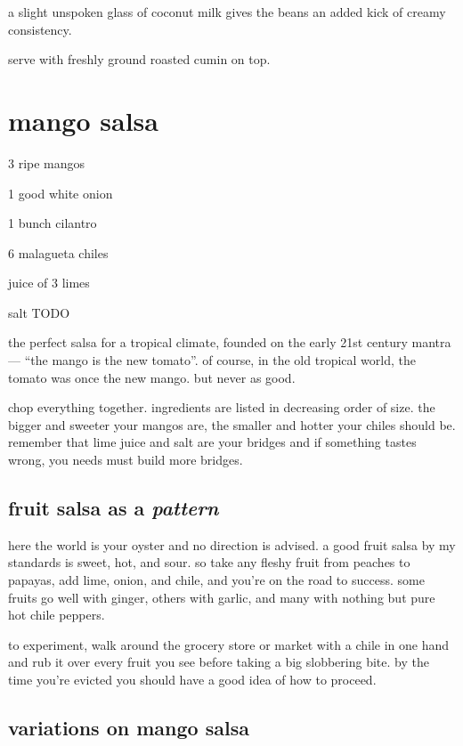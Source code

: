 a slight unspoken glass of coconut milk gives the beans an added kick
of creamy consistency.

serve with freshly ground roasted cumin on top.

\section{mango salsa}

\begin{ingredients}
  \item 3 ripe mangos
  \item 1 good white onion
  \item 1 bunch cilantro
  \item 6 malagueta chiles
  \item juice of 3 limes

  \item salt TODO
\end{ingredients}

the perfect salsa for a tropical climate, founded on the early 21st
century mantra --- ``the mango is the new tomato''. of course, in the
old tropical world, the tomato was once the new mango. but never as
good.

chop everything together. ingredients are listed in decreasing order
of size. the bigger and sweeter your mangos are, the smaller and
hotter your chiles should be. remember that lime juice and salt are
your bridges and if something tastes wrong, you needs must build more
bridges.

\subsection{fruit salsa as a \textit{pattern}}

here the world is your oyster and no direction is advised. a good
fruit salsa by my standards is sweet, hot, and sour. so take any
fleshy fruit from peaches to papayas, add lime, onion, and chile, and
you're on the road to success. some fruits go well with ginger, others
with garlic, and many with nothing but pure hot chile peppers.

to experiment, walk around the grocery store or market with a chile in
one hand and rub it over every fruit you see before taking a big
slobbering bite. by the time you're evicted you should have a good
idea of how to proceed.

\subsection{variations on mango salsa}

